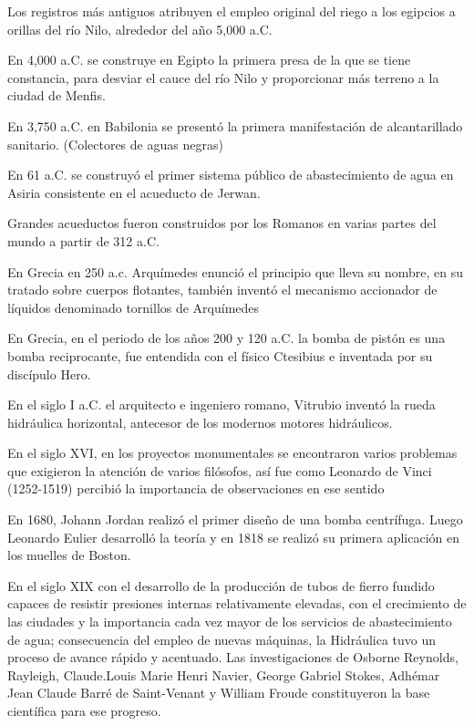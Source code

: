 Los registros más antiguos atribuyen el empleo original del riego a los egipcios a orillas del río Nilo, alrededor del año 5,000 a.C. 

En 4,000 a.C. se construye en Egipto la primera presa de la que se tiene constancia, para desviar el cauce del río Nilo y proporcionar más terreno a la ciudad de Menfis. 

En 3,750 a.C. en Babilonia se presentó la primera manifestación de alcantarillado sanitario. (Colectores de aguas negras)

En 61 a.C. se construyó el primer sistema público de abastecimiento de agua en Asiria consistente en el acueducto de Jerwan. 

Grandes acueductos fueron construidos por los Romanos en varias partes del mundo a partir de 312 a.C.

En Grecia en 250 a.c. Arquímedes enunció el principio que lleva su nombre, en su tratado sobre cuerpos flotantes, también inventó el mecanismo accionador de líquidos denominado tornillos de Arquímedes

En Grecia, en el periodo de los años 200 y 120 a.C. la bomba de pistón es una bomba reciprocante, fue entendida con el físico Ctesibius e inventada por su discípulo Hero.

En el siglo I a.C. el arquitecto e ingeniero romano, Vitrubio inventó la rueda hidráulica horizontal, antecesor de los modernos motores hidráulicos.

En el siglo XVI, en los proyectos monumentales se encontraron varios problemas que exigieron la atención de varios filósofos, así fue como Leonardo de Vinci (1252-1519)
percibió la importancia de observaciones en ese sentido

En 1680, Johann Jordan realizó el primer diseño de una bomba centrífuga.
Luego Leonardo Eulier desarrolló la teoría y en 1818 se realizó su primera aplicación en los muelles de Boston.


En el siglo XIX con el desarrollo de la producción de tubos de fierro fundido capaces de resistir presiones internas 
relativamente elevadas, con el crecimiento de las ciudades y la importancia cada vez mayor de los servicios de abastecimiento 
de agua; consecuencia del empleo de nuevas máquinas, la Hidráulica tuvo un proceso de avance rápido y acentuado. 
Las investigaciones de Osborne Reynolds, Rayleigh, 
Claude.Louis Marie Henri Navier, George Gabriel Stokes,
Adhémar Jean Claude Barré de Saint-Venant y William Froude 
constituyeron la base científica para ese progreso.

